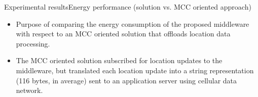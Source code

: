 \documentclass[8pt,xcolor={dvipsnames},handout]{beamer}
\begin{document}
\begin{frame}{Experimental results}{Energy performance (solution vs. MCC oriented approach)}
{
\small{}
\begin{itemize}
  \item Purpose of comparing the energy consumption of the proposed middleware with respect to an MCC oriented solution that offloads location data processing.
  \item The MCC oriented solution subscribed for location updates to the middleware, but translated each location update into a string representation (116 bytes, in average) sent to an application server using cellular data network.
\end{itemize}
}

\begin{table}
\centering
{}
\end{table}
\end{frame}
\end{document}
